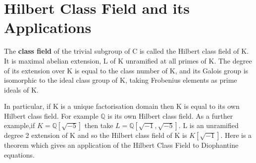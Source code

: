\documentclass[preprint,12pt,reqno]{elsarticle}
\begin{document}
\section{Hilbert Class Field and its Applications}
The \textbf{class field} of the trivial subgroup of C is called the Hilbert class field of K. It is maximal abelian extension, L of K unramified at all primes of K. The degree of its extension over K is equal to the class number of K, and its Galois group is isomorphic to the ideal class group of K, taking Frobenius elements as prime ideals of K.\par
In particular, if K is a unique factorisation domain then K is equal to its own Hilbert class field. For example $\mathbb{Q}$ is its own Hilbert class field. 
As a further example,if $K=\mathbb{Q}[\sqrt{-5}]$ then take $L=\mathbb{Q}[\sqrt{-1},\sqrt{-5}]$. L is an unramified degree 2 extension of K and so the Hilbert class field of K is $K[\sqrt{-1}]$. Here is a theorem which gives an application of the Hilbert Class Field to Diophantine equations.
\end{document}
